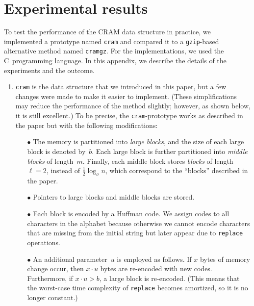 \documentclass{llncs}
\begin{document}
\section{Experimental results}
\label{sec:experiments}

To test the performance of the CRAM data structure in practice, we
implemented a prototype named \texttt{cram} and compared it to
a \texttt{gzip}-based alternative method named \texttt{cramgz}.
For the implementations, we used the C~programming language.
In this appendix, we describe the details of the experiments and the outcome.


\begin{enumerate}
\item
\texttt{cram} is the data structure that we introduced in this paper, but
a few changes were made to make it easier to implement.
(These simplifications may reduce the performance of the method slightly;
however, as shown below, it is still excellent.)
To be precise, the \texttt{cram}-prototype works as described in the paper
but with the following modifications:

\smallskip

\begin{itemize}
\item[{\raise0.3pt\hbox{$\bullet$}}]
The memory is partitioned into \emph{large blocks}, and the size of each
large block is denoted by~$b$.
Each large block is further partitioned into \emph{middle blocks} of
length~$m$.
Finally, each middle block stores \emph{blocks} of length
$\ell = 2$, instead of $\frac{1}{2}\log_\sigma n$, 
which correspond to the ``blocks'' described in the paper.

\smallskip
\item[{\raise0.3pt\hbox{$\bullet$}}]
Pointers to large blocks and middle blocks are stored.

\smallskip
\item[{\raise0.3pt\hbox{$\bullet$}}]
Each block is encoded by a Huffman code.
We assign codes to all characters in the alphabet because otherwise we
cannot encode characters that are missing from the initial string but later
appear due to \texttt{replace} operations.

\smallskip
\item[{\raise0.3pt\hbox{$\bullet$}}]
An additional parameter~$u$ is employed as follows.
If $x$ bytes of memory change occur, then $x \cdot u$ bytes are re-encoded
with new codes.
Furthermore, if $x \cdot u > b$, a large block is re-encoded.
(This means that the worst-case time complexity of \texttt{replace}
becomes amortized, so it is no longer constant.)
\end{itemize}


\end{enumerate}
\end{document}

